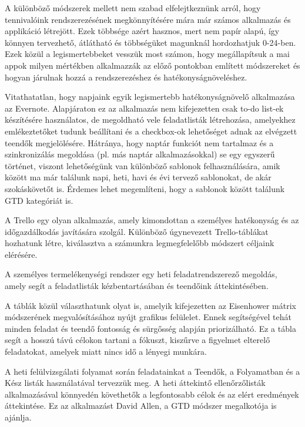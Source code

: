 
A különböző módszerek mellett nem szabad elfelejtkeznünk arról, hogy tennivalóink rendszerezésének megkönnyítésére mára már számos alkalmazás és applikáció létrejött. Ezek többsége azért hasznos, mert nem papír alapú, így könnyen tervezhető, átlátható és többségüket magunknál hordozhatjuk 0-24-ben. Ezek közül a legismertebbeket vesszük most számon, hogy megállapítsuk a mai appok milyen mértékben alkalmazzák az előző pontokban említett módszereket és hogyan járulnak hozzá a rendszerezéshez és hatékonyságnöveléshez.


Vitathatatlan, hogy napjaink egyik legismertebb hatékonyságnövelő alkalmazása az Evernote. Alapjáraton ez az alkalmazás nem kifejezetten csak to-do list-ek készítésére használatos, de megoldható vele feladatlisták létrehozása, amelyekhez emlékeztetőket tudunk beállítani és a checkbox-ok lehetőséget adnak az elvégzett teendők megjelölésére. Hátránya, hogy naptár funkciót nem tartalmaz és a szinkronizálás megoldása (pl. más naptár alkalmazásokkal) se egy egyszerű történet, viszont lehetőségünk van különböző sablonok felhasználására, amik között ma már találunk napi, heti, havi és évi tervező sablonokat, de akár szokáskövetőt is. Érdemes lehet megemlíteni, hogy a sablonok között találunk GTD kategóriát is.


A Trello egy olyan alkalmazás, amely kimondottan a személyes hatékonyság és az időgazdálkodás javítására szolgál. Különböző úgynevezett Trello-táblákat hozhatunk létre, kiválasztva a számunkra legmegfelelőbb módszert céljaink elérésére.

A személyes termelékenységi rendszer egy heti feladatrendszerező megoldás, amely segít a feladatlisták kézbentartásában és teendőink áttekintésében.

A táblák közül választhatunk olyat is, amelyik kifejezetten az Eisenhower mátrix módszerének megvalósításához nyújt grafikus felülelet. Ennek segítségével tehát minden feladat és teendő fontosság és sürgősség alapján priorizálható. Ez a tábla segít a hosszú távú célokon tartani a fókuszt, kiszűrve a figyelmet elterelő feladatokat, amelyek miatt nincs idő a lényegi munkára.

A heti felülvizsgálati folyamat során feladatainkat a Teendők, a Folyamatban és a Kész listák használatával tervezzük meg. A heti áttekintő ellenőrzőlisták alkalmazásával könnyedén követhetők a legfontosabb célok és az elért eredmények áttekintése. Ez az alkalmazást David Allen, a GTD módszer megalkotója is ajánlja.

